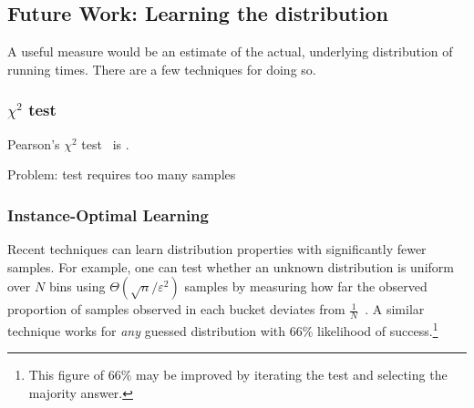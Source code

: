 \documentclass{article}
\begin{document}





\subsection{Future Work: Learning the distribution}

A useful measure would be an estimate of the actual, underlying distribution of running times.
There are a few techniques for doing so.

\subsubsection*{$\chi^2$ test}
Pearson's $\chi^2$ test~\cite{todo} is .

Problem: test requires too many samples

\subsubsection*{Instance-Optimal Learning}

Recent techniques can learn distribution properties with significantly fewer samples.
For example, one can test whether an unknown distribution is uniform over $N$ bins using $\Theta(\sqrt{n}/\varepsilon^2)$ samples by measuring how far the observed proportion of samples observed in each bucket deviates from $\frac{1}{N}$~\cite{todo}.
A similar technique works for \emph{any} guessed distribution with $66\%$ likelihood of success.\footnote{This figure of $66\%$ may be improved by iterating the test and selecting the majority answer.}
\end{document}
